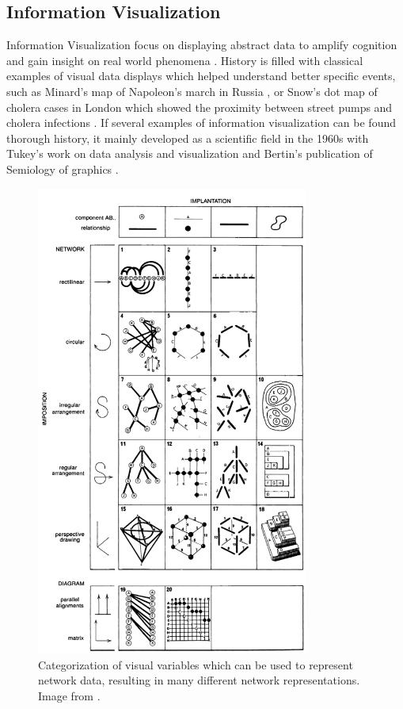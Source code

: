\subsection{Information Visualization}

Information Visualization focus on displaying abstract data to amplify cognition and gain insight on real world phenomena \cite{cardReadingsInformationVisualization1999}.
History is filled with classical examples of visual data displays which helped understand better specific events, such as Minard's map of Napoleon's march in Russia \cite{friendlyVisionsReVisionsCharles2002}, or Snow's dot map of cholera cases in London which showed the proximity between street pumps and cholera infections \cite{snowModeCommunicationCholera1856}.
If several examples of information visualization can be found thorough history, it mainly developed as a scientific field in the 1960s with Tukey's work on data analysis and visualization \cite{tukeyFutureDataAnalysis1962} and Bertin's publication of Semiology of graphics \cite{bertin1967}.


\begin{figure}
    \centering %
    \includegraphics[width=0.8\textwidth]{static/figures/RelatedWork/BertinNetworks}
    \caption{Categorization of visual variables which can be used to represent network data, resulting in many different network representations. Image from \cite{bertin1967}.}
    \label{fig:bertin-network}
\end{figure}

